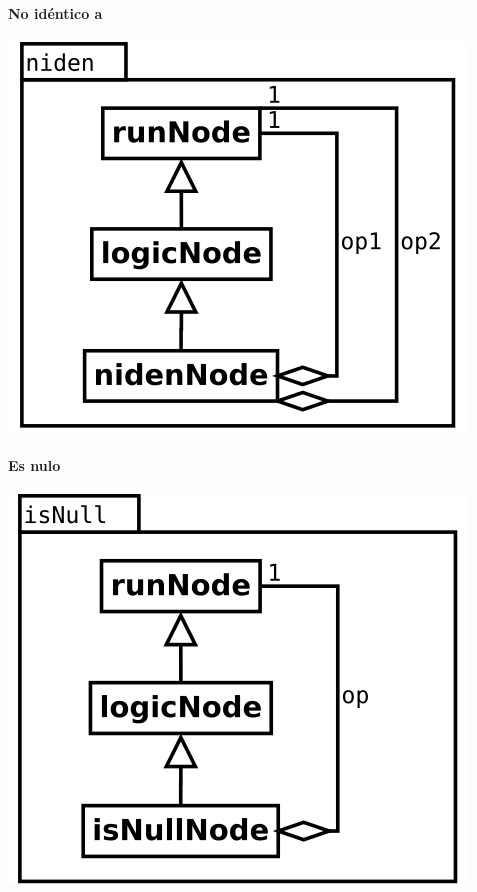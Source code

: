 \paragraph {No idéntico a}
\begin{center}
\includegraphics[scale=0.4]{niden.png} \\
\end{center}

\paragraph {Es nulo}
\begin{center}
\includegraphics[scale=0.4]{isNull.png} \\
\end{center}

